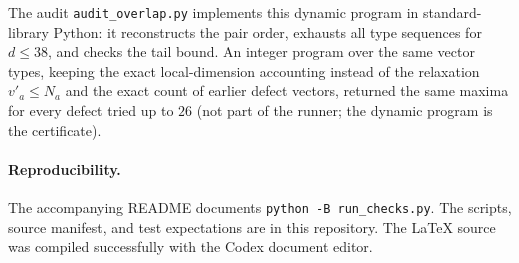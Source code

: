 \documentclass[11pt]{article}
\begin{document}
The audit \texttt{audit\_overlap.py} implements this dynamic program in
standard-library Python: it reconstructs the pair order, exhausts all type
sequences for $d\le38$, and checks the tail bound. An integer program over
the same vector types, keeping the exact local-dimension accounting instead
of the relaxation $v'_a\le N_a$ and the exact count of earlier defect
vectors, returned the same maxima for every defect tried up to $26$ (not
part of the runner; the dynamic program is the certificate).

\paragraph{Reproducibility.}
The accompanying README documents \texttt{python -B run\_checks.py}.
The scripts, source manifest, and test expectations are in this repository.
The LaTeX source was compiled successfully with the Codex document editor.
\end{document}
